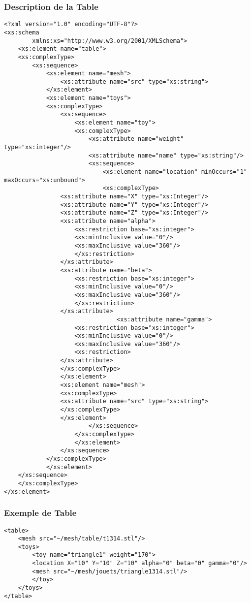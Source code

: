 \subsubsection{Description de la Table}
 \begin{lstlisting}[caption=Description de la Table, label=desctable]
<?xml version="1.0" encoding="UTF-8"?>
<xs:schema
        xmlns:xs="http://www.w3.org/2001/XMLSchema">
    <xs:element name="table">
    <xs:complexType>
        <xs:sequence>
            <xs:element name="mesh">
                <xs:attribute name="src" type="xs:string">
            </xs:element>
            <xs:element name="toys">
            <xs:complexType>
                <xs:sequence>
                    <xs:element name="toy">
                    <xs:complexType>
                        <xs:attribute name="weight" type="xs:integer"/>
                        <xs:attribute name="name" type="xs:string"/>
                        <xs:sequence>
                            <xs:element name="location" minOccurs="1" maxOccurs="xs:unbound">
                            <xs:complexType>
				<xs:attribute name="X" type="xs:Integer"/>
				<xs:attribute name="Y" type="xs:Integer"/>
				<xs:attribute name="Z" type="xs:Integer"/>
				<xs:attribute name="alpha">
				    <xs:restriction base="xs:integer">
					<xs:minInclusive value="0"/>
					<xs:maxInclusive value="360"/>
				    </xs:restriction> 
				</xs:attribute>
				<xs:attribute name="beta">
				    <xs:restriction base="xs:integer">
					<xs:minInclusive value="0"/>
					<xs:maxInclusive value="360"/>
				    </xs:restriction>
				</xs:attribute>
                                <xs:attribute name="gamma">
				    <xs:restriction base="xs:integer">
					<xs:minInclusive value="0"/>
					<xs:maxInclusive value="360"/>
				    <xs:restriction>
				</xs:attribute>
			    </xs:complexType>
			    </xs:element>
			    <xs:element name="mesh">
			    <xs:complexType>
				<xs:attribute name="src" type="xs:string">
			    </xs:complexType>
			    </xs:element>
                        </xs:sequence>
                    </xs:complexType>
                    </xs:element>
                </xs:sequence>
            </xs:complexType>
            </xs:element>
	</xs:sequence>
    </xs:complexType>
</xs:element>
\end{lstlisting}
  
\subsubsection{Exemple de Table}
\begin{lstlisting}[caption=Exemple de table, label=desctable]
<table>
    <mesh src="~/mesh/table/t1314.stl"/>
	<toys>
	    <toy name="triangle1" weight="170">
		<location X="10" Y="10" Z="10" alpha="0" beta="0" gamma="0"/>
		<mesh src="~/mesh/jouets/triangle1314.stl"/>
	    </toy>
	</toys>
</table>
\end{lstlisting}
